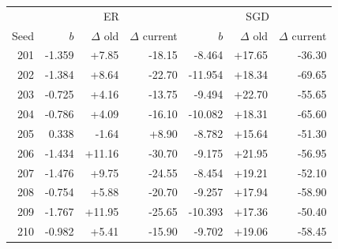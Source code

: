 \begin{tabular}{rrrrrrr}
\toprule
 & \multicolumn{3}{c}{ER} & \multicolumn{3}{c}{SGD} \\
Seed & $b$ & $\Delta$ old & $\Delta$ current & $b$ & $\Delta$ old & $\Delta$ current \\
\midrule
201 & -1.359 & +7.85 & -18.15 & -8.464 & +17.65 & -36.30 \\
202 & -1.384 & +8.64 & -22.70 & -11.954 & +18.34 & -69.65 \\
203 & -0.725 & +4.16 & -13.75 & -9.494 & +22.70 & -55.65 \\
204 & -0.786 & +4.09 & -16.10 & -10.082 & +18.31 & -65.60 \\
205 & 0.338 & -1.64 & +8.90 & -8.782 & +15.64 & -51.30 \\
206 & -1.434 & +11.16 & -30.70 & -9.175 & +21.95 & -56.95 \\
207 & -1.476 & +9.75 & -24.55 & -8.454 & +19.21 & -52.10 \\
208 & -0.754 & +5.88 & -20.70 & -9.257 & +17.94 & -58.90 \\
209 & -1.767 & +11.95 & -25.65 & -10.393 & +17.36 & -50.40 \\
210 & -0.982 & +5.41 & -15.90 & -9.702 & +19.06 & -58.45 \\
\bottomrule
\end{tabular}
